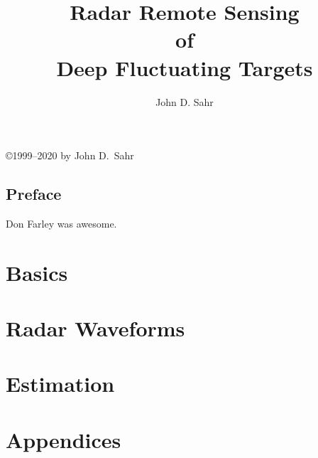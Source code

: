\documentclass[12pt]{book}
\title{Radar Remote Sensing\\ of\\ Deep Fluctuating Targets}
\author{John D. Sahr}
\begin{document}
\maketitle

\rule{0mm}{0mm}
\vfill

\centerline{\copyright{1999--2020} by John D.~Sahr}

\vfill

\rule{0mm}{0mm}

\tableofcontents

\newpage

\chapter{Preface}

Don Farley was awesome.

\part{Basics}





\part{Radar Waveforms}






\part{Estimation}




\part{Appendices}

\appendix







\end{document}
